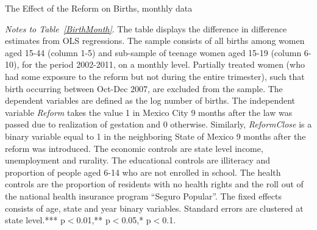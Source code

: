 \documentclass[a4paper, 11pt]{article}
\begin{document}
\begin{spacing}{1.4}
\begin{table}\caption{The Effect of the Reform on Births, monthly data} \label{BirthMonth}	
  \begin{threeparttable}
    {\footnotesize  }
    \begin{tablenotes}
      \footnotesize
    \item \textit{Notes to Table~\ref{BirthMonth}}. The table displays the difference in difference estimates from OLS regressions. The sample consists of all births among women aged 15-44 (column 1-5) and sub-sample of teenage women aged 15-19 (column 6-10), for the period 2002-2011, on a monthly level. Partially treated women (who had some exposure to the reform but not during the entire trimester), such that birth occurring between Oct-Dec 2007, are excluded from the sample. The dependent variables are defined as the log number of births. The independent variable \textit{Reform} takes the value 1 in Mexico City 9 months after the law was passed due to realization of gestation and 0 otherwise. Similarly, \textit{ReformClose} is a binary variable equal to 1 in the neighboring State of Mexico 9 months after the reform was introduced. The economic controls are state level income, unemployment and rurality. The educational controls are illiteracy and proportion of people aged 6-14 who are not enrolled in school. The health controls are the proportion of residents with no health rights and the roll out of the national health insurance program ``Seguro Popular''. The fixed effects consists of age, state and year binary variables. Standard errors are clustered at state level.*** p$<$0.01,** p$<$0.05,* p$<$0.1.
    \end{tablenotes} 
  \end{threeparttable}
\end{table}


\end{spacing}
\end{document}
